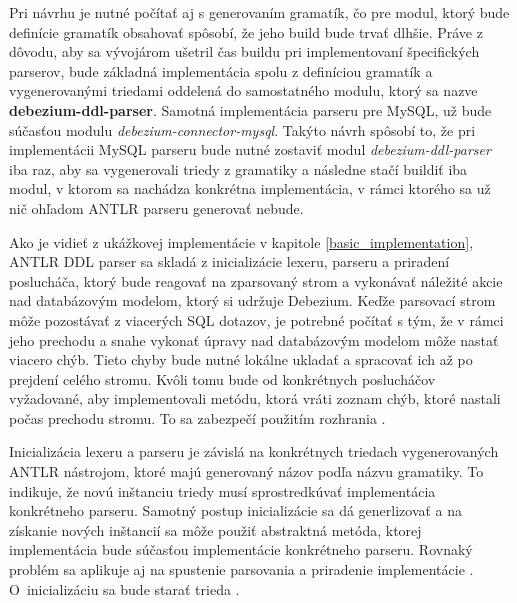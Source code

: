 Pri návrhu je nutné počítať aj s generovaním gramatík, čo pre modul, ktorý bude definície gramatík obsahovať spôsobí, že jeho build bude trvať dlhšie. Práve z dôvodu, aby sa vývojárom ušetril čas buildu pri implementovaní špecifických parserov, bude základná implementácia spolu z definíciou gramatík a vygenerovanými triedami oddelená do samostatného modulu, ktorý sa nazve \textbf{debezium-ddl-parser}. Samotná implementácia parseru pre MySQL, už bude súčasťou modulu \textit{debezium-connector-mysql}. Takýto návrh spôsobí to, že pri implementácii MySQL parseru bude nutné zostaviť modul \textit{debezium-ddl-parser} iba raz, aby sa vygenerovali triedy z gramatiky a následne stačí buildiť iba modul, v ktorom sa nachádza konkrétna implementácia, v rámci ktorého sa už nič ohľadom ANTLR parseru generovať nebude.

Ako je vidieť z ukážkovej implementácie v kapitole \ref{basic_implementation}, ANTLR DDL parser sa skladá z inicializácie lexeru, parseru a priradení poslucháča, ktorý bude reagovať na zparsovaný strom a vykonávať náležité akcie nad databázovým modelom, ktorý si udržuje Debezium. 
Keďže parsovací strom môže pozostávať z viacerých SQL dotazov, je potrebné počítať s tým, že v rámci jeho prechodu a snahe vykonať úpravy nad databázovým modelom môže nastať viacero chýb. Tieto chyby bude nutné lokálne ukladať a spracovať ich až po prejdení celého stromu. Kvôli tomu bude od konkrétnych poslucháčov vyžadované, aby implementovali metódu, ktorá vráti zoznam chýb, ktoré nastali počas prechodu stromu. To sa zabezpečí použitím rozhrania . 

Inicializácia lexeru a parseru je závislá na konkrétnych triedach vygenerovaných ANTLR nástrojom, ktoré majú generovaný názov podľa názvu gramatiky. To indikuje, že novú inštanciu triedy musí sprostredkúvať implementácia konkrétneho parseru. Samotný postup inicializácie sa dá generlizovať a na získanie nových inštancií sa môže použiť abstraktná metóda, ktorej implementácia bude súčasťou implementácie konkrétneho parseru. Rovnaký problém sa aplikuje aj na spustenie parsovania a priradenie implementácie . \mbox{O inicializáciu} sa bude starať trieda .

